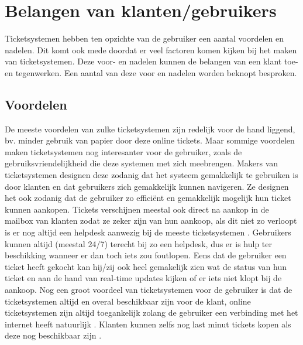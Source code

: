 
\section{Belangen van klanten/gebruikers}
Ticketsystemen hebben ten opzichte van de gebruiker een aantal voordelen en nadelen. Dit komt ook mede doordat er veel factoren komen kijken bij het maken van ticketsystemen. 
Deze voor- en nadelen kunnen de belangen van een klant toe- en tegenwerken. Een aantal van deze voor en nadelen worden beknopt besproken. 

\subsection{Voordelen}
De meeste voordelen van zulke ticketsystemen zijn redelijk voor de hand liggend, bv. minder gebruik van papier door deze online tickets.
Maar sommige voordelen maken ticketsystemen nog interesanter voor de gebruiker, zoals de gebruiksvriendelijkheid die deze systemen met zich meebrengen.
Makers van ticketsystemen designen deze zodanig dat het systeem gemakkelijk te gebruiken is door klanten en dat gebruikers zich gemakkelijk kunnen navigeren.
Ze designen het ook zodanig dat de gebruiker zo efficiënt en gemakkelijk mogelijk hun ticket kunnen aankopen. Tickets verschijnen meestal ook direct na aankop 
in de mailbox van klanten zodat ze zeker zijn van hun aankoop, als dit niet zo verloopt is er nog altijd een helpdesk aanwezig bij de meeste ticketsystemen \cite{cm-voordelen}.
Gebruikers kunnen altijd (meestal 24/7) terecht bij zo een helpdesk, dus er is hulp ter beschikking wanneer er dan toch iets zou foutlopen.
Eens dat de gebruiker een ticket heeft gekocht kan hij/zij ook heel gemakelijk zien wat de status van hun ticket en aan de hand van real-time updates kijken of er iets niet klopt bij de aankoop.
Nog een groot voordeel van ticketsystemen voor de gebruiker is dat de ticketsystemen altijd en overal beschikbaar zijn voor de klant,
online ticketsystemen zijn altijd toegankelijk zolang de gebruiker een verbinding met het internet heeft natuurlijk \cite{Benefitsonline2023}.
Klanten kunnen zelfs nog last minut tickets kopen als deze nog beschikbaar zijn \cite{cm-voordelen}.

